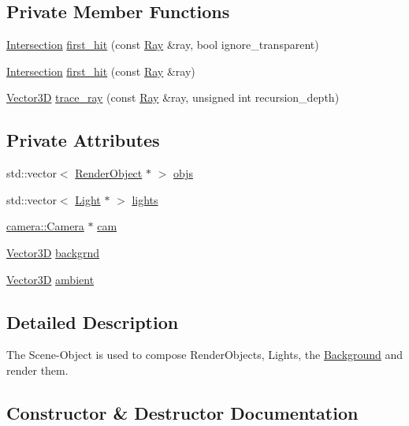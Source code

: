 \subsection*{Private Member Functions}
\begin{DoxyCompactItemize}
\item 
\hyperlink{classIntersection}{Intersection} \hyperlink{classScene_a671595e773bd4336c0fa67186aff609d}{first\+\_\+hit} (const \hyperlink{classRay}{Ray} \&ray, bool ignore\+\_\+transparent)
\item 
\hyperlink{classIntersection}{Intersection} \hyperlink{classScene_a726867ff812fd8776fe0b4319538e9e7}{first\+\_\+hit} (const \hyperlink{classRay}{Ray} \&ray)
\item 
\hyperlink{classVector3D}{Vector3D} \hyperlink{classScene_a9ccd15bf4c359c1585fe87d85d424d55}{trace\+\_\+ray} (const \hyperlink{classRay}{Ray} \&ray, unsigned int recursion\+\_\+depth)
\end{DoxyCompactItemize}
\subsection*{Private Attributes}
\begin{DoxyCompactItemize}
\item 
std\+::vector$<$ \hyperlink{classRenderObject}{Render\+Object} $\ast$ $>$ \hyperlink{classScene_a37361b6054643b62fcb8e6b7c828e5dd}{objs}
\item 
std\+::vector$<$ \hyperlink{classLight}{Light} $\ast$ $>$ \hyperlink{classScene_a4ecc3182a80435e1c4dfbe1b20e559bd}{lights}
\item 
\hyperlink{classcamera_1_1Camera}{camera\+::\+Camera} $\ast$ \hyperlink{classScene_a3e5448bc1b1150aa67049914b7800b63}{cam}
\item 
\hyperlink{classVector3D}{Vector3D} \hyperlink{classScene_ac745fba97d639cebcf0e8fbf59967da2}{backgrnd}
\item 
\hyperlink{classVector3D}{Vector3D} \hyperlink{classScene_a284ce5b2aeb47c64d6712d9748229c47}{ambient}
\end{DoxyCompactItemize}


\subsection{Detailed Description}
The Scene-\/\+Object is used to compose Render\+Objects, Lights, the \hyperlink{classBackground}{Background} and render them. 

\subsection{Constructor \& Destructor Documentation}
